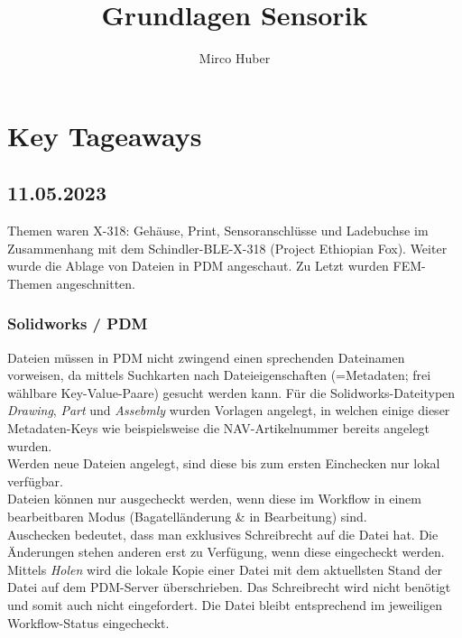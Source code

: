 \documentclass[12pt,a4paper]{article}
\author{Mirco Huber}
\title{Grundlagen Sensorik}
\begin{document}
	\maketitle
	\newpage
	\section{Key Tageaways}
	\subsection{11.05.2023}
	Themen waren X-318: Gehäuse, Print, Sensoranschlüsse und Ladebuchse im Zusammenhang mit dem Schindler-BLE-X-318 (Project Ethiopian Fox). Weiter wurde die Ablage von Dateien in PDM angeschaut. Zu Letzt wurden FEM-Themen angeschnitten.
	\subsubsection{Solidworks / PDM}
	Dateien müssen in PDM nicht zwingend einen sprechenden Dateinamen vorweisen, da mittels Suchkarten nach Dateieigenschaften (=Metadaten; frei wählbare Key-Value-Paare) gesucht werden kann. Für die Solidworks-Dateitypen \textit{Drawing}, \textit{Part} und \textit{Assebmly} wurden Vorlagen angelegt, in welchen einige dieser Metadaten-Keys wie beispielsweise die NAV-Artikelnummer bereits angelegt wurden.\\
	Werden neue Dateien angelegt, sind diese bis zum ersten Einchecken nur lokal verfügbar.\\
	Dateien können nur ausgecheckt werden, wenn diese im Workflow in einem bearbeitbaren Modus (Bagatelländerung \& in Bearbeitung) sind.\\
	Auschecken bedeutet, dass man exklusives Schreibrecht auf die Datei hat. Die Änderungen stehen anderen erst zu Verfügung, wenn diese eingecheckt werden.\\
	Mittels \textit{Holen} wird die lokale Kopie einer Datei mit dem aktuellsten Stand der Datei auf dem PDM-Server überschrieben. Das Schreibrecht wird nicht benötigt und somit auch nicht eingefordert. Die Datei bleibt entsprechend im jeweiligen Workflow-Status eingecheckt.
\end{document}
